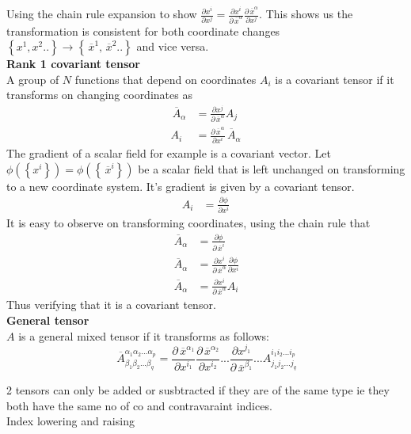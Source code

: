 \documentclass{article}
\newcommand{\set}[1]{ \left\{ #1 \right\} }
\newcommand{\olsi}[1]{\,\overline{\!{#1}}} %
\newcommand{\bx}{\olsi{x}}
\begin{document}
Using the chain rule expansion to show \(\frac{\partial x^i}{\partial x^j} =  \frac{\partial x^i}{\partial \bx^\alpha} \frac{\partial \bx^\alpha }{\partial x^j} \).
This shows us the transformation is consistent for both coordinate changes \(\set{x^1,x^2..}\to \set{\bx^1,\bx^2..} \) and vice versa. \\
\textbf{Rank 1 covariant tensor} \\
A group of \(N\) functions that depend on coordinates \(A_{i}\) is a covariant tensor if it transforms on changing coordinates as
\begin{align*}
    \olsi{A}_\alpha &= \frac{\partial x^j }{\partial \bx^\alpha}A_j \\
    A_i &= \frac{\partial \bx^\alpha }{\partial x^i}\olsi{A}_\alpha
\end{align*} 
The gradient of a scalar field for example is a covariant vector. Let \(\phi(\set{x^i}) = \phi(\set{\bx^i}) \) 
be a scalar field that is left unchanged on transforming to a new coordinate system. It's gradient is 
given by a covariant tensor. 
\begin{align*}
    A_i &= \frac{\partial \phi}{\partial x^i}
\end{align*}
It is easy to observe on transforming coordinates, using the chain rule that  
\begin{align*}
    \olsi{A}_\alpha &= \frac{\partial \phi}{\partial \bx^i} \\
    \olsi{A}_\alpha &= \frac{\partial x^i}{\partial \bx^\alpha}\frac{\partial \phi}{\partial x^i} \\
    \olsi{A}_\alpha &= \frac{\partial x^i}{\partial \bx^\alpha}A_i
\end{align*}
Thus verifying that it is a covariant tensor. 
\\
\textbf{General tensor} \\
\(A\) is a general mixed tensor if it transforms as follows: 
\begin{equation*}
    \olsi{A}_{\beta_1\beta_2...\beta_q}^{\alpha_1\alpha_2...\alpha_p} = \frac{\partial\bx^{\alpha_1}}{\partial x^{i_1}}\frac{\partial\bx^{\alpha_2}}{\partial x^{i_2}}...\frac{\partial x^{j_1}}{\partial \bx^{\beta_1}}...A_{j_1j_2...j_q}^{i_1i_2...i_p}
\end{equation*}

2 tensors can only be added or susbtracted if they are of the same type ie they both 
have the same no of co and contravaraint indices. \\
Index lowering and raising 
\end{document}
